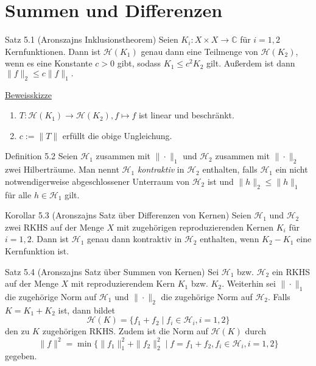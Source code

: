 \documentclass{beamer}
\begin{document}
\section{Summen und Differenzen}
\begin{frame}
\begin{block}{Satz 5.1 (Aronszajns Inklusionstheorem)}
Seien $K_i:X\times X\to \mathbb{C}$ für $i=1,2$ Kernfunktionen. Dann ist $\mathcal{H}(K_1)$ genau dann eine Teilmenge von $\mathcal{H}(K_2)$, wenn  es eine Konstante $c>0 $ gibt, sodass $K_1 \leq c^2 K_2$ gilt. 
Außerdem ist dann $\|f \|_2 \leq c\|f\|_1.$ 
\end{block}
\end{frame}
\begin{frame}
\underline{Beweisskizze}\pause 
\begin{enumerate}
\item $T:\mathcal{H}(K_1)\to \mathcal{H}(K_2),f\mapsto f$ ist linear und beschränkt.\pause 
\item $c:=\|T\|$ erfüllt die obige Ungleichung.
\end{enumerate}
\end{frame}
\begin{frame}
\begin{block}{Definition 5.2}
Seien $\mathcal{H}_1$ zusammen mit $\|\cdot\|_1$ und $\mathcal{H}_2$ zusammen mit $\| \cdot\|_2$ zwei Hilberträume. Man nennt $\mathcal{H}_1$ \emph{kontraktiv} in $\mathcal{H}_2$  enthalten, falls $\mathcal{H}_1$ ein nicht notwendigerweise abgeschlossener Unterraum von $\mathcal{H}_2$ ist und $\|h\|_2 \leq \|h\|_1$ für alle $h \in \mathcal{H}_1$ gilt.
\end{block}
\end{frame}


\begin{frame}
\begin{block}{Korollar 5.3 (Aronszajns Satz über Differenzen von Kernen)} 
Seien $\mathcal{H}_1$ und $\mathcal{H}_2$ zwei RKHS auf der Menge $X$ mit zugehörigen reproduzierenden Kernen $K_i$ für $i=1,2$. Dann ist $\mathcal{H}_1$ genau dann kontraktiv in $\mathcal{H}_2$ enthalten, wenn $K_2-K_1$ eine Kernfunktion ist.
\end{block}
\end{frame}

\begin{frame}
\begin{block}{Satz 5.4 (Aronszajns Satz über Summen von Kernen)}
Sei $\mathcal{H}_1$ bzw. $\mathcal{H}_2$ ein RKHS auf der Menge $X$ mit reproduzierendem Kern $K_1$ bzw. $K_2.$ Weiterhin sei $\|\cdot\|_1$ die zugehörige Norm auf $\mathcal{H}_1$ und $\|\cdot\|_2$ die zugehörige Norm auf $\mathcal{H}_2.$ Falls $K=K_1+K_2$ ist, dann bildet 
 \[
\mathcal{H}(K)=\{f_1+f_2\mid f_i\in \mathcal{H}_i,i=1,2\} 
 \] 
 den zu $K$ zugehörigen RKHS. Zudem ist die Norm auf $\mathcal{H}(K)$ durch 
 \[
\|f\|^2=\min\{\|f_1\|_1^2+\|f_2\|_2^2\mid f=f_1+f_2,f_i\in \mathcal{H}_i,i=1,2\} 
 \]
 gegeben.
\end{block}
\end{frame}
\end{document}
